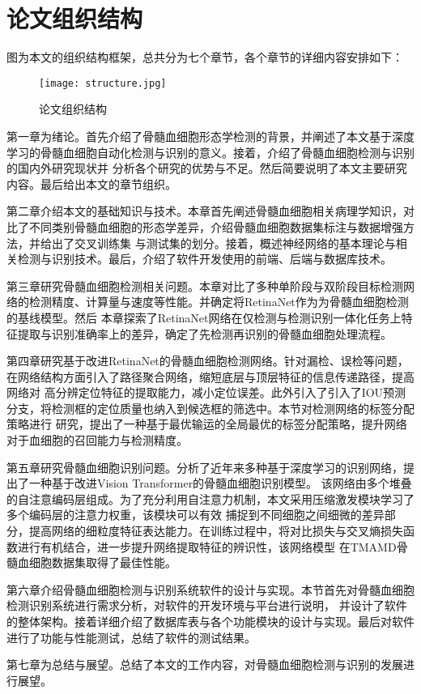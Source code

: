 \section{论文组织结构}
图为本文的组织结构框架，总共分为七个章节，各个章节的详细内容安排如下：

\begin{figure}
    \centering
    \texttt{[image: structure.jpg]}
    \caption{论文组织结构}
    \label{fig:structure}
  \end{figure}
  
第一章为绪论。首先介绍了骨髓血细胞形态学检测的背景，并阐述了本文基于深度学习的骨髓血细胞自动化检测与识别的意义。接着，介绍了骨髓血细胞检测与识别的国内外研究现状并
分析各个研究的优势与不足。然后简要说明了本文主要研究内容。最后给出本文的章节组织。

第二章介绍本文的基础知识与技术。本章首先阐述骨髓血细胞相关病理学知识，对比了不同类别骨髓血细胞的形态学差异，介绍骨髓血细胞数据集标注与数据增强方法，并给出了交叉训练集
与测试集的划分。接着，概述神经网络的基本理论与相关检测与识别技术。最后，介绍了软件开发使用的前端、后端与数据库技术。

第三章研究骨髓血细胞检测相关问题。本章对比了多种单阶段与双阶段目标检测网络的检测精度、计算量与速度等性能。并确定将RetinaNet作为为骨髓血细胞检测的基线模型。然后
本章探索了RetinaNet网络在仅检测与检测识别一体化任务上特征提取与识别准确率上的差异，确定了先检测再识别的骨髓血细胞处理流程。

第四章研究基于改进RetinaNet的骨髓血细胞检测网络。针对漏检、误检等问题，在网络结构方面引入了路径聚合网络，缩短底层与顶层特征的信息传递路径，提高网络对
高分辨定位特征的提取能力，减小定位误差。此外引入了引入了IOU预测分支，将检测框的定位质量也纳入到候选框的筛选中。本节对检测网络的标签分配策略进行
研究，提出了一种基于最优输运的全局最优的标签分配策略，提升网络对于血细胞的召回能力与检测精度。

第五章研究骨髓血细胞识别问题。分析了近年来多种基于深度学习的识别网络，提出了一种基于改进Vision Transformer的骨髓血细胞识别模型。
该网络由多个堆叠的自注意编码层组成。为了充分利用自注意力机制，本文采用压缩激发模块学习了多个编码层的注意力权重，该模块可以有效
捕捉到不同细胞之间细微的差异部分，提高网络的细粒度特征表达能力。在训练过程中，将对比损失与交叉熵损失函数进行有机结合，进一步提升网络提取特征的辨识性，该网络模型
在TMAMD骨髓血细胞数据集取得了最佳性能。

第六章介绍骨髓血细胞检测与识别系统软件的设计与实现。本节首先对骨髓血细胞检测识别系统进行需求分析，对软件的开发环境与平台进行说明，
并设计了软件的整体架构。接着详细介绍了数据库表与各个功能模块的设计与实现。最后对软件进行了功能与性能测试，总结了软件的测试结果。

第七章为总结与展望。总结了本文的工作内容，对骨髓血细胞检测与识别的发展进行展望。



